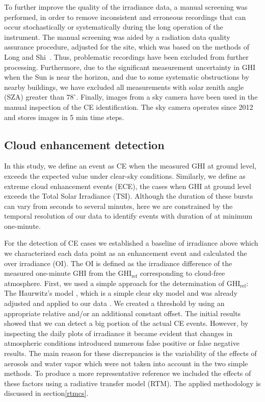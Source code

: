 \documentclass[preprint, 5p,
authoryear]{elsarticle} %
\begin{document}
To further improve the quality of the irradiance data, a manual
screening was performed, in order to remove inconsistent and erroneous
recordings that can occur stochastically or systematically during the
long operation of the instrument. The manual screening was aided by a
radiation data quality assurance procedure, adjusted for the site, which
was based on the methods of Long and Shi~\citep{Long2006, Long2008a}.
Thus, problematic recordings have been excluded from further processing.
Furthermore, due to the significant measurement uncertainty in GHI when
the Sun is near the horizon, and due to some systematic obstructions by
nearby buildings, we have excluded all measurements with solar zenith
angle (SZA) greater than \(78^\circ\). Finally, images from a sky camera
have been used in the manual inspection of the CE identification. The
sky camera operates since 2012 and stores images in 5 min time steps.

\hypertarget{cloud-enhancement-detection}{%
\subsection{Cloud enhancement
detection}\label{cloud-enhancement-detection}}

In this study, we define an event as CE when the measured GHI at ground
level, exceeds the expected value under clear-sky conditions. Similarly,
we define as extreme cloud enhancement events (ECE), the cases when GHI
at ground level exceeds the Total Solar Irradiance (TSI). Although the
duration of these bursts can vary from seconds to several minutes, here
we are constrained by the temporal resolution of our data to identify
events with duration of at minimum one-minute.

For the detection of CE cases we established a baseline of irradiance
above which we characterized each data point as an enhancement event and
calculated the over irradiance (OI). The OI is defined as the irradiance
difference of the measured one-minute GHI from the
\(\text{GHI}_\text{ref}\) corresponding to cloud-free atmosphere. First,
we used a simple approach for the determination of
\(\text{GHI}_\text{ref}\): The Haurwitz's model \citep{Haurwitz1945},
which is a simple clear sky model and was already adjusted and applied
to our data \citep{Natsis2023}. We created a threshold by using an
appropriate relative and/or an additional constant offset. The initial
results showed that we can detect a big portion of the actual CE events.
However, by inspecting the daily plots of irradiance it became evident
that changes in atmospheric conditions introduced numerous false
positive or false negative results. The main reason for these
discrepancies is the variability of the effects of aerosols and water
vapor which were not taken into account in the two simple methods. To
produce a more representative reference we included the effects of these
factors using a radiative transfer model (RTM). The applied methodology
is discussed in section\nobreakspace{}\ref{rtmcs}.
\end{document}
